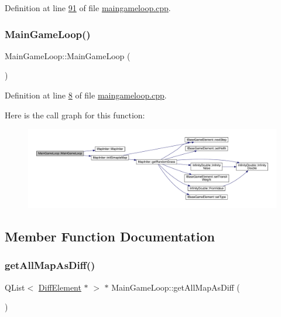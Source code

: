 Definition at line \hyperlink{a00089_source_l00091}{91} of file \hyperlink{a00089_source}{maingameloop.\+cpp}.

\mbox{\label{a00209_a0632599cb00fa2c86ba1c71904c1f59f}} 
\subsubsection{\texorpdfstring{Main\+Game\+Loop()}{MainGameLoop()}}
{\footnotesize\ttfamily Main\+Game\+Loop\+::\+Main\+Game\+Loop (\begin{DoxyParamCaption}{ }\end{DoxyParamCaption})\hspace{0.3cm}{\ttfamily [private]}}



Definition at line \hyperlink{a00089_source_l00008}{8} of file \hyperlink{a00089_source}{maingameloop.\+cpp}.

Here is the call graph for this function\+:
\nopagebreak
\begin{figure}[H]
\begin{center}
\leavevmode
\includegraphics[width=350pt]{d3/de5/a00209_a0632599cb00fa2c86ba1c71904c1f59f_cgraph}
\end{center}
\end{figure}


\subsection{Member Function Documentation}
\mbox{\label{a00209_ac4cd47d8b350ae45ea09aaecad11a684}} 
\subsubsection{\texorpdfstring{get\+All\+Map\+As\+Diff()}{getAllMapAsDiff()}}
{\footnotesize\ttfamily Q\+List$<$ \hyperlink{a00141}{Diff\+Element} $\ast$ $>$ $\ast$ Main\+Game\+Loop\+::get\+All\+Map\+As\+Diff (\begin{DoxyParamCaption}{ }\end{DoxyParamCaption})\hspace{0.3cm}{\ttfamily [protected]}}



